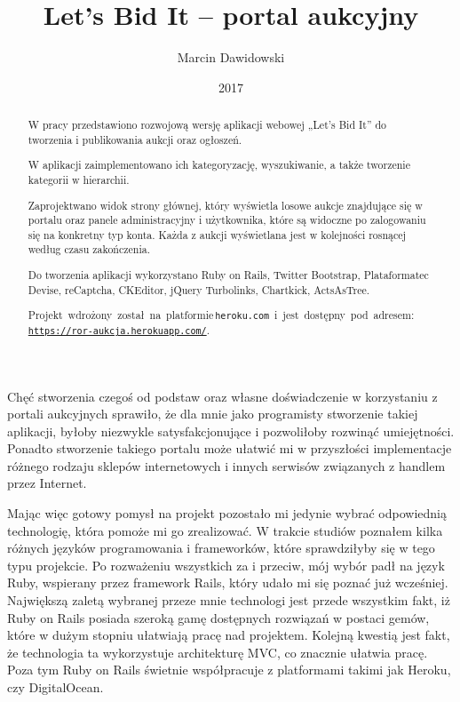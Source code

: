 \documentclass[brudnopis]{xmgr}
\author   {Marcin Dawidowski}
\title    {Let’s Bid It – portal aukcyjny}
\date     {2017}
\begin{document}
\begin{abstract}
  W pracy przedstawiono rozwojową wersję aplikacji webowej „Let's Bid It” do tworzenia i publikowania aukcji oraz ogłoszeń.
  
  W aplikacji zaimplementowano ich kategoryzację, wyszukiwanie, a także tworzenie kategorii w hierarchii.

  Zaprojektwano widok strony głównej, który wyświetla losowe aukcje znajdujące się w portalu oraz panele administracyjny i użytkownika, które są widoczne po zalogowaniu się na konkretny typ konta. Każda z aukcji wyświetlana jest w kolejności rosnącej według czasu zakończenia.

  Do tworzenia aplikacji wykorzystano Ruby on Rails, Twitter Bootstrap, Plataformatec Devise, reCaptcha, CKEditor, jQuery Turbolinks, Chartkick, ActsAsTree.

\mbox{Projekt wdrożony został na platformie\, \\\texttt{heroku.com} i jest dostępny pod adresem:} \\\texttt{\url{https://ror-aukcja.herokuapp.com/}}.


\end{abstract}


\maketitle

\introduction

Chęć stworzenia czegoś od podstaw oraz własne doświadczenie w korzystaniu z portali aukcyjnych sprawiło, że dla mnie jako programisty stworzenie takiej aplikacji, byłoby niezwykle satysfakcjonujące i pozwoliłoby rozwinąć umiejętności. Ponadto stworzenie takiego portalu może ułatwić mi w przyszłości implementacje różnego rodzaju sklepów internetowych i innych serwisów związanych z handlem przez Internet.

Mając więc gotowy pomysł na projekt pozostało mi jedynie wybrać odpowiednią technologię, która pomoże mi go zrealizować. W trakcie studiów poznałem kilka różnych języków programowania i frameworków, które sprawdziłyby się w tego typu projekcie. Po rozważeniu wszystkich za i przeciw, mój wybór padł na język Ruby, wspierany przez framework Rails, który udało mi się poznać już wcześniej. Największą zaletą wybranej przeze mnie technologi jest przede wszystkim fakt, iż Ruby on Rails posiada szeroką gamę dostępnych rozwiązań w postaci gemów, które w dużym stopniu ułatwiają pracę nad projektem. Kolejną kwestią jest fakt, że technologia  ta wykorzystuje architekturę MVC, co znacznie ułatwia pracę. Poza tym Ruby on Rails świetnie współpracuje z platformami takimi jak Heroku, czy DigitalOcean. 
\end{document}
